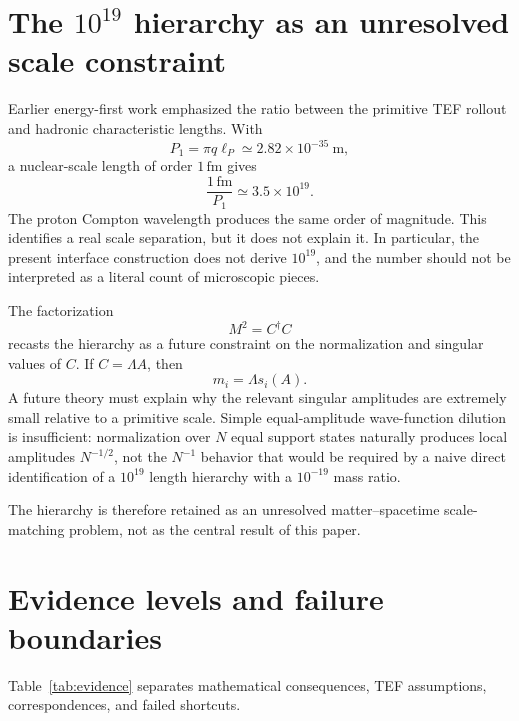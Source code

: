 \documentclass[10pt]{article}
\begin{document}
\section{The $10^{19}$ hierarchy as an unresolved scale constraint}
\label{sec:hierarchy}

Earlier energy-first work emphasized the ratio between the primitive TEF rollout and hadronic characteristic lengths. With
\begin{equation}
P_1=\pi q\ell_P\simeq2.82\times10^{-35}\ \mathrm{m},
\end{equation}
a nuclear-scale length of order $1\,\mathrm{fm}$ gives
\begin{equation}
\frac{1\,\mathrm{fm}}{P_1}\simeq3.5\times10^{19}.
\label{eq:hierarchy}
\end{equation}
The proton Compton wavelength produces the same order of magnitude. This identifies a real scale separation, but it does not explain it. In particular, the present interface construction does not derive $10^{19}$, and the number should not be interpreted as a literal count of microscopic pieces.

The factorization
\begin{equation}
M^2=C^\dagger C
\end{equation}
recasts the hierarchy as a future constraint on the normalization and singular values of $C$. If $C=\Lambda A$, then
\begin{equation}
m_i=\Lambda s_i(A).
\end{equation}
A future theory must explain why the relevant singular amplitudes are extremely small relative to a primitive scale. Simple equal-amplitude wave-function dilution is insufficient: normalization over $N$ equal support states naturally produces local amplitudes $N^{-1/2}$, not the $N^{-1}$ behavior that would be required by a naive direct identification of a $10^{19}$ length hierarchy with a $10^{-19}$ mass ratio.

The hierarchy is therefore retained as an unresolved matter--spacetime scale-matching problem, not as the central result of this paper.

\section{Evidence levels and failure boundaries}
\label{sec:evidence}

Table~\ref{tab:evidence} separates mathematical consequences, TEF assumptions, correspondences, and failed shortcuts.
\end{document}
